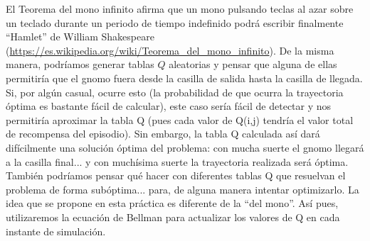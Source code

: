 \documentclass{article}
\begin{document}

El Teorema del mono infinito afirma que un mono pulsando teclas al azar sobre un teclado durante un periodo de tiempo indefinido podrá escribir finalmente ``Hamlet'' de William Shakespeare (\url{https://es.wikipedia.org/wiki/Teorema_del_mono_infinito}). De la misma manera, podríamos generar tablas $Q$ aleatorias y pensar que alguna de ellas permitiría que el gnomo fuera desde la casilla de salida hasta la casilla de llegada. Si, por algún casual, ocurre esto (la probabilidad de que ocurra la trayectoria óptima es bastante fácil de calcular), este caso sería fácil de detectar y nos permitiría aproximar la tabla Q (pues cada valor de Q(i,j) tendría el valor total de recompensa del episodio). Sin embargo, la tabla Q calculada así dará difícilmente una solución óptima del problema: con mucha suerte el gnomo llegará a la casilla final... y con muchísima suerte la trayectoria realizada será óptima. También podríamos pensar qué hacer con diferentes tablas Q que resuelvan el problema de forma subóptima... para, de alguna manera intentar optimizarlo. La idea que se propone en esta práctica es diferente de la ``del mono''. Así pues, utilizaremos la ecuación de Bellman para actualizar los valores de Q en cada instante de simulación.

\end{document}
